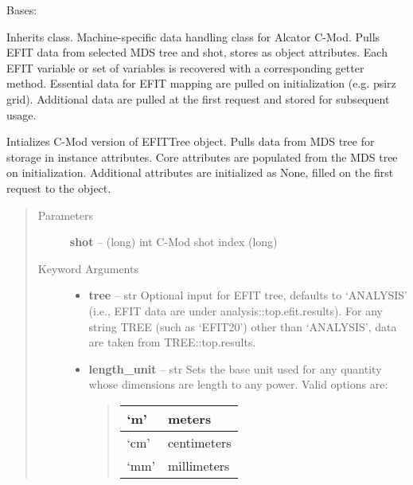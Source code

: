 \documentclass[letterpaper,10pt,english]{sphinxmanual}
\begin{document}
\begin{fulllineitems}
\label{eqtools:eqtools.CModEFIT.CModEFITTree}
Bases: {\hyperref[eqtools:eqtools.EFIT.EFITTree]{}}

Inherits  class. Machine-specific data
handling class for Alcator C-Mod. Pulls EFIT data from selected MDS tree
and shot, stores as object attributes. Each EFIT variable or set of
variables is recovered with a corresponding getter method. Essential data
for EFIT mapping are pulled on initialization (e.g. psirz grid). Additional
data are pulled at the first request and stored for subsequent usage.

Intializes C-Mod version of EFITTree object.  Pulls data from MDS tree for storage
in instance attributes.  Core attributes are populated from the MDS tree on initialization.
Additional attributes are initialized as None, filled on the first request to the object.
\begin{quote}\begin{description}
\item[{Parameters }] \leavevmode
\textbf{shot} --
(long) int
C-Mod shot index (long)

\item[{Keyword Arguments}] \leavevmode\begin{itemize}
\item {} 
\textbf{tree} --
str
Optional input for EFIT tree, defaults to `ANALYSIS'
(i.e., EFIT data are under analysis::top.efit.results).
For any string TREE (such as `EFIT20') other than `ANALYSIS',
data are taken from TREE::top.results.

\item {} 
\textbf{length\_unit} --
str
Sets the base unit used for any quantity whose
dimensions are length to any power. Valid options are:
\begin{quote}

\begin{tabulary}{\linewidth}{|L|L|}
\hline

`m'
 & 
meters
\\\hline

`cm'
 & 
centimeters
\\\hline

`mm'
 & 
millimeters
\\\hline


\end{tabulary}
\end{quote}
\end{itemize}
\end{description}
\end{quote}
\end{fulllineitems}
\end{document}
